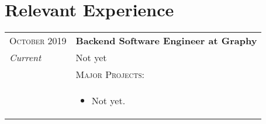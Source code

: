 \section{Relevant Experience}\label{sec:relevant-experience}

\begin{tabular}{p{60pt}|p{11cm}}
    \hspace*{\fill}\textsc{October 2019} & \textbf{Backend Software Engineer at Graphy} \\

    \hspace*{\fill}\emph{Current}& \small{
    Not yet
    } \\

    \ & \vspace{1pt}\textsc{Major Projects}: \\

    &\vspace{-0.9em}
    \begin{itemize}[itemsep=0pt,topsep=0pt,leftmargin=*]
        \small
        \item Not yet.
    \end{itemize}

\end{tabular} \\ \\ \\

